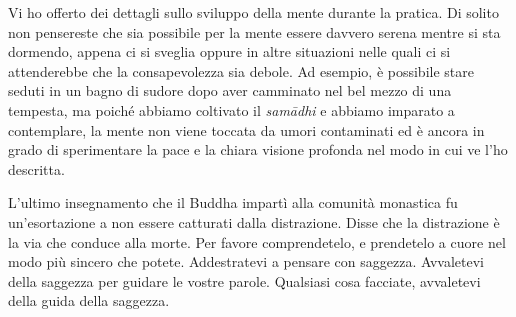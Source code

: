 Vi ho offerto dei dettagli sullo sviluppo della mente durante la
pratica. Di solito non pensereste che sia possibile per la mente essere
davvero serena mentre si sta dormendo, appena ci si sveglia oppure in
altre situazioni nelle quali ci si attenderebbe che la consapevolezza
sia debole. Ad esempio, è possibile stare seduti in un bagno di sudore
dopo aver camminato nel bel mezzo di una tempesta, ma poiché abbiamo
coltivato il \emph{samādhi} e abbiamo imparato a contemplare, la mente
non viene toccata da umori contaminati ed è ancora in grado di
sperimentare la pace e la chiara visione profonda nel modo in cui ve
l'ho descritta.

L'ultimo insegnamento che il Buddha impartì alla comunità monastica fu
un'esortazione a non essere catturati dalla distrazione. Disse che la
distrazione è la via che conduce alla morte. Per favore comprendetelo, e
prendetelo a cuore nel modo più sincero che potete. Addestratevi a
pensare con saggezza. Avvaletevi della saggezza per guidare le vostre
parole. Qualsiasi cosa facciate, avvaletevi della guida della saggezza.

